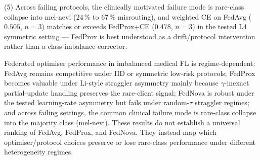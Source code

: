 \documentclass[11pt,a4paper]{report}
\begin{document}
(5) Across failing protocols, the clinically motivated failure mode is
rare-class collapse into mel-nevi ($24\,\%$ to $67\,\%$ misrouting), and
weighted CE on FedAvg ($0.505$, $n=3$) matches or exceeds FedProx+CE
($0.478$, $n=3$) in the tested L4 symmetric setting --- FedProx is best
understood as a drift/protocol intervention rather than a class-imbalance
corrector.

Federated optimiser performance in imbalanced medical FL is regime-dependent:
FedAvg remains competitive under IID or symmetric low-risk protocols;
FedProx becomes valuable under Li-style straggler asymmetry mainly because
$\gamma$-inexact partial-update handling preserves the rare-client signal;
FedNova is robust under the tested learning-rate asymmetry but fails under
random-$\tau$ straggler regimes; and across failing settings, the common
clinical failure mode is rare-class collapse into the majority class
(mel-nevi). These results do not establish a universal ranking of FedAvg,
FedProx, and FedNova. They instead map which optimiser/protocol choices
preserve or lose rare-class performance under different heterogeneity
regimes.


\end{document}
